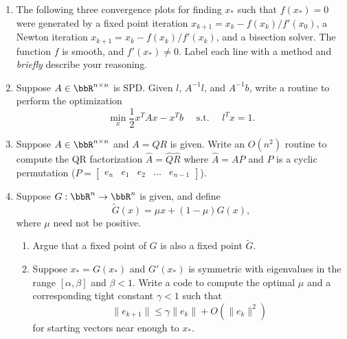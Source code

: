 \documentclass[12pt, leqno]{article}
\begin{document}
\begin{enumerate}
\item
  The following three convergence plots for finding $x_*$ such that
  $f(x_*) = 0$ were generated by a fixed point iteration
  $x_{k+1} = x_k - f(x_k)/f'(x_0)$, a Newton iteration
  $x_{k+1} = x_k - f(x_k)/f'(x_k)$, and a bisection solver.
  The function $f$ is smooth, and $f'(x_*) \neq 0$.
  Label each line with a method and {\em briefly} describe your
  reasoning.
  \begin{center}
  \end{center}

\item
  Suppose $A \in \bbR^{n \times n}$ is SPD.  Given $l$, $A^{-1} l$,
  and $A^{-1} b$, write a routine to perform the optimization
  \[
    \min_{x} \frac{1}{2} x^T A x - x^T b \quad \mbox{ s.t. } \quad l^Tx = 1.
  \]

\item
  Suppose $A \in \bbR^{n \times n}$ and $A = QR$ is given.  Write an
  $O(n^2)$ routine to compute the QR factorization $\hat{A} = \hat{Q}
  \hat{R}$ where $\hat{A} = AP$ and $P$ is a cyclic permutation
  ($P = \begin{bmatrix} e_n & e_1 & e_2 & \ldots & e_{n-1} \end{bmatrix}$).

\item
  Suppose $G : \bbR^n \rightarrow \bbR^n$ is given, and define
  \[
    \tilde{G}(x) = \mu x + (1-\mu) G(x),
  \]
  where $\mu$ need not be positive.
  \begin{enumerate}
  \item Argue that a fixed point of $G$ is also a fixed point
    $\tilde{G}$.
  \item Suppose $x_* = G(x_*)$ and $G'(x_*)$ is symmetric with eigenvalues
    in the range $[\alpha, \beta]$ and $\beta < 1$.  Write a code to
    compute the optimal $\mu$ and a corresponding tight constant
    $\gamma < 1$ such that
    \[
      \|e_{k+1}\| \leq \gamma \|e_k\| + O(\|e_k\|^2)
    \]
    for starting vectors near enough to $x_*$.
  \end{enumerate}


\end{enumerate}
\end{document}
